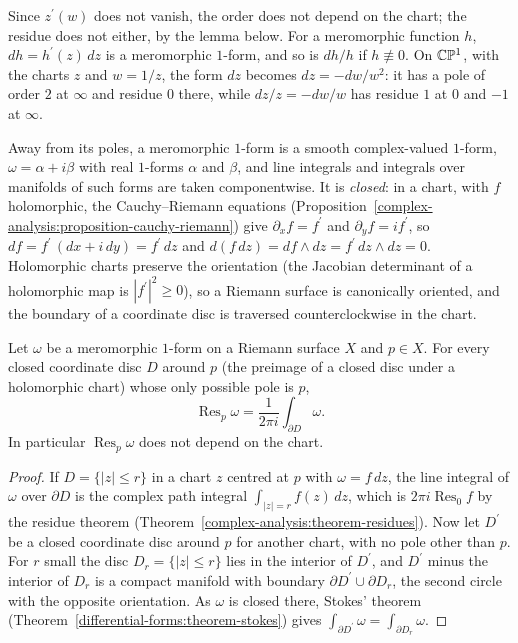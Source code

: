 Since $z^{\prime}(w)$ does not vanish, the order does not depend on the chart; the residue does not either, by the lemma below. For a meromorphic function $h$, $dh = h^{\prime}(z)\,dz$ is a
meromorphic $1$-form, and so is $dh/h$ if $h \not\equiv 0$. On $\mathbb{C}\mathbb{P}^1$, with the charts $z$ and $w = 1/z$, the form $dz$ becomes $dz = -dw/w^2$: it has a pole of order $2$ at $\infty$ and residue $0$
there, while $dz/z = -dw/w$ has residue $1$ at $0$ and $-1$ at $\infty$.

Away from its poles, a meromorphic $1$-form is a smooth complex-valued $1$-form, $\omega = \alpha + i\beta$ with real $1$-forms $\alpha$ and $\beta$, and line integrals and integrals over manifolds
of such forms are taken componentwise. It is \emph{closed}: in a chart, with $f$ holomorphic, the Cauchy--Riemann equations (Proposition~\ref{complex-analysis:proposition-cauchy-riemann}) give
$\partial_xf = f^{\prime}$ and $\partial_yf = if^{\prime}$, so $df = f^{\prime}\,(dx + i\,dy) = f^{\prime}\,dz$ and $d(f\,dz) = df \wedge dz = f^{\prime}\,dz \wedge dz = 0$. Holomorphic charts preserve the orientation (the
Jacobian determinant of a holomorphic map is $|f^{\prime}|^2 \geq 0$), so a Riemann surface is canonically oriented, and the boundary of a coordinate disc is traversed counterclockwise in the chart.

\begin{lemma}\label{complex-manifolds:lemma-residue-integral}
Let $\omega$ be a meromorphic $1$-form on a Riemann surface $X$ and $p \in X$. For every closed coordinate disc $D$ around $p$ (the preimage of a closed disc under a holomorphic chart) whose only
possible pole is $p$,
\[
\operatorname{Res}_p\omega = \frac{1}{2\pi i}\int_{\partial D}\omega .
\]
In particular $\operatorname{Res}_p\omega$ does not depend on the chart.
\end{lemma}

\begin{proof}
If $D = \{|z| \leq r\}$ in a chart $z$ centred at $p$ with $\omega = f\,dz$, the line integral of $\omega$ over $\partial D$ is the complex path integral $\int_{|z| = r}f(z)\,dz$, which is
$2\pi i\operatorname{Res}_0f$ by the residue theorem (Theorem~\ref{complex-analysis:theorem-residues}). Now let $D^{\prime}$ be a closed coordinate disc around $p$ for another chart, with no pole other than
$p$. For $r$ small the disc $D_r = \{|z| \leq r\}$ lies in the interior of $D^{\prime}$, and $D^{\prime}$ minus the interior of $D_r$ is a compact manifold with boundary $\partial D^{\prime} \cup \partial D_r$, the
second circle with the opposite orientation. As $\omega$ is closed there, Stokes' theorem (Theorem~\ref{differential-forms:theorem-stokes}) gives $\int_{\partial D^{\prime}}\omega = \int_{\partial D_r}\omega$.
\end{proof}

